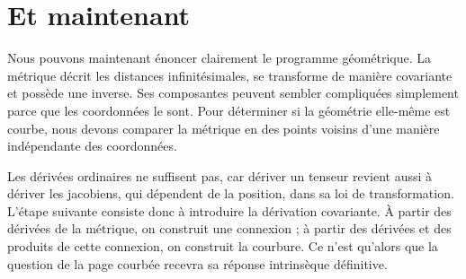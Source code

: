 \section{Et maintenant}

Nous pouvons maintenant énoncer clairement le programme géométrique. La métrique décrit les distances infinitésimales, se transforme de manière covariante et possède une inverse. Ses composantes peuvent sembler compliquées simplement parce que les coordonnées le sont. Pour déterminer si la géométrie elle-même est courbe, nous devons comparer la métrique en des points voisins d’une manière indépendante des coordonnées.

Les dérivées ordinaires ne suffisent pas, car dériver un tenseur revient aussi à dériver les jacobiens, qui dépendent de la position, dans sa loi de transformation. L’étape suivante consiste donc à introduire la dérivation covariante. À partir des dérivées de la métrique, on construit une connexion ; à partir des dérivées et des produits de cette connexion, on construit la courbure. Ce n’est qu’alors que la question de la page courbée recevra sa réponse intrinsèque définitive.